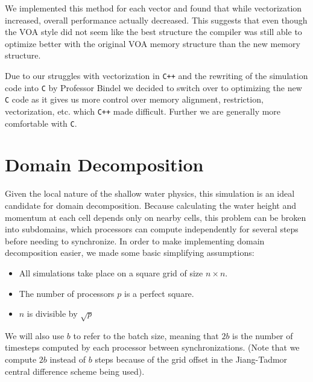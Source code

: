 \documentclass[11pt]{article}
\newcommand{\ttt}{\texttt}
\begin{document}
We implemented this method for each vector and found that while vectorization increased, overall performance actually decreased. This suggests that even though the VOA style did not seem like the best structure the compiler was still able to optimize better with the original VOA memory structure than the new memory structure.

Due to our struggles with vectorization in \ttt{C++} and the rewriting of the simulation code into \ttt{C} by Professor Bindel we decided to switch over to optimizing the new \ttt{C} code as it gives us more control over memory alignment, restriction, vectorization, etc. which \ttt{C++} made difficult. Further we are generally more comfortable with \ttt{C}.

\section{Domain Decomposition}

Given the local nature of the shallow water physics, this simulation is an ideal candidate for domain decomposition. Because calculating the water height and momentum at each cell depends only on nearby cells, this problem can be broken into subdomains, which processors can compute independently for several steps before needing to synchronize. In order to make implementing domain decomposition easier, we made some basic simplifying assumptions:

\begin{itemize}
	\item All simulations take place on a square grid of size $n \times n$.
	\item The number of processors $p$ is a perfect square.
	\item $n$ is divisible by $\sqrt{p}$
\end{itemize}

We will also use $b$ to refer to the batch size, meaning that $2b$ is the number of timesteps computed by each processor between synchronizations. (Note that we compute $2b$ instead of $b$ steps because of the grid offset in the Jiang-Tadmor central difference scheme being used).
\end{document}
